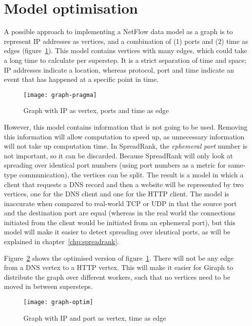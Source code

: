 \section{Model optimisation}
\label{sec:model_optimisation}
A possible approach to implementing a NetFlow data model as a graph is to represent IP addresses as vertices, and a combination of (1) ports and (2) time as edges (figure~\ref{fig:graph-pragma}).
This model contains vertices with many edges, which could take a long time to calculate per superstep.
It is a strict separation of time and space; IP addresses indicate a location, whereas protocol, port and time indicate an event that has happened at a specific point in time.

\begin{figure}[h!]
	\caption{Graph with IP as vertex, ports and time as edge}
	\label{fig:graph-pragma}
	\centering
		\texttt{[image: graph-pragma]}
\end{figure}

However, this model contains information that is not going to be used.
Removing this information will allow computation to speed up, as unnecessary information will not take up computation time.
In SpreadRank, the \emph{\gls{ephemeral port}} number is not important,
 so it can be discarded.
Because SpreadRank will only look at spreading over identical port numbers (using port numbers as a metric for same-type communication),
 the vertices can be split.
The result is a model in which a client that requests a DNS record and then a website will be represented by two vertices,
 one for the DNS client and one for the HTTP client.
The model is inaccurate when compared to real-world TCP or UDP in that the source port and the destination port are equal
 (whereas in the real world the connections initiated from the client would be initiated from an \gls{ephemeral port}),
 but this model will make it easier to detect spreading over identical ports, as will be explained in chapter~\ref{chp:spreadrank}.

Figure~\ref{fig:graph-optim} shows the optimised version of figure~\ref{fig:graph-pragma}.
There will not be any edge from a DNS vertex to a HTTP vertex.
This will make it easier for Giraph to distribute the graph over different workers,
 such that no vertices need to be moved in between supersteps.

\begin{figure}[h!]
	\caption{Graph with IP and port as vertex, time as edge}
	\label{fig:graph-optim}
	\centering
		\texttt{[image: graph-optim]}
\end{figure}


